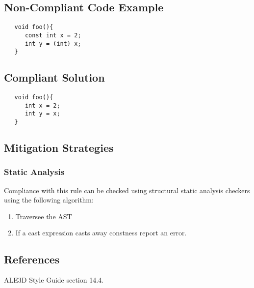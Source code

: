 \subsection{Non-Compliant Code Example}


\begin{verbatim}
   void foo(){
      const int x = 2;
      int y = (int) x;
   }
\end{verbatim}

\subsection{Compliant Solution}


\begin{verbatim}
   void foo(){
      int x = 2;
      int y = x;
   }

\end{verbatim}

\subsection{Mitigation Strategies}
\subsubsection{Static Analysis} 

Compliance with this rule can be checked using structural static analysis checkers using the following algorithm:

\begin{enumerate}
\item Traversee the AST
\item If a cast expression casts away constness report an error.
\end{enumerate}

\subsection{References}
ALE3D Style Guide section 14.4.
